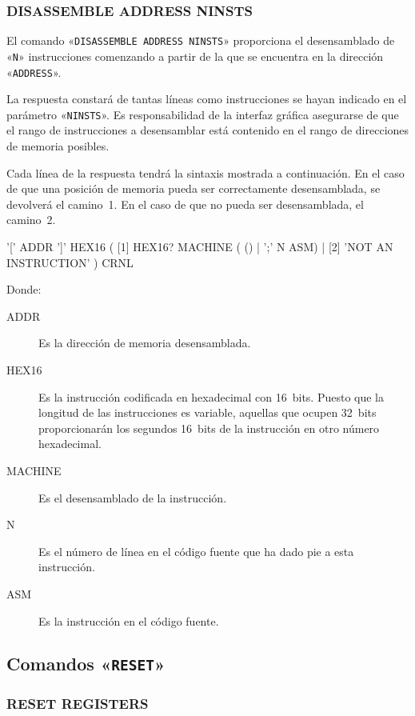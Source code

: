 \documentclass[notitlepage,11pt,a4paper,final,twoside]{article}
\begin{document}
\subsubsection{DISASSEMBLE ADDRESS NINSTS}
\label{sec:disassemble}

El comando «\texttt{DISASSEMBLE ADDRESS NINSTS}» proporciona el
desensamblado de «\texttt{N}» instrucciones comenzando a partir de la
que se encuentra en la dirección «\texttt{ADDRESS}».

La respuesta constará de tantas líneas como instrucciones se hayan
indicado en el parámetro «\texttt{NINSTS}». Es responsabilidad de la
interfaz gráfica asegurarse de que el rango de instrucciones a
desensamblar está contenido en el rango de direcciones de memoria
posibles.

Cada línea de la respuesta tendrá la sintaxis mostrada a
continuación. En el caso de que una posición de memoria pueda ser
correctamente desensamblada, se devolverá el camino~1. En el caso de
que no pueda ser desensamblada, el camino~2.

\begin{rail}
 '[' ADDR ']' HEX16
  (
    [1]  HEX16? MACHINE ( () | ';' N ASM) | 
    [2] 'NOT AN INSTRUCTION'
  ) CRNL
\end{rail}

Donde:
\begin{description}
\item[ADDR] Es la dirección de memoria desensamblada.
\item[HEX16] Es la instrucción codificada en hexadecimal con
  16~bits. Puesto que la longitud de las instrucciones es variable,
  aquellas que ocupen 32~bits proporcionarán los segundos 16~bits de
  la instrucción en otro número hexadecimal.
\item[MACHINE] Es el desensamblado de la instrucción.
\item[N] Es el número de línea en el código fuente que ha dado pie a
  esta instrucción.
\item[ASM] Es la instrucción en el código fuente.
\end{description}

\subsection{Comandos «\texttt{RESET}»}

\subsubsection{RESET REGISTERS}
\end{document}
